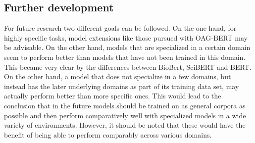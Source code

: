 \subsection{Further development}
For future research two different goals can be followed. On the one hand, for highly specific tasks, model extensions like those pursued with OAG-BERT may be advisable. On the other hand, models that are specialized in a certain domain seem to perform better than models that have not been trained in this domain. This became very clear by the differences between BioBert, SciBERT and BERT. On the other hand, a model that does not specialize in a few domains, but instead has the later underlying domains as part of its training data set, may actually perform better than more specific ones. This would lead to the conclusion that in the future models should be trained on as general corpora as possible and then perform comparatively well with specialized models in a wide variety of environments. However, it should be noted that these would have the benefit of being able to perform comparably across various domains. 